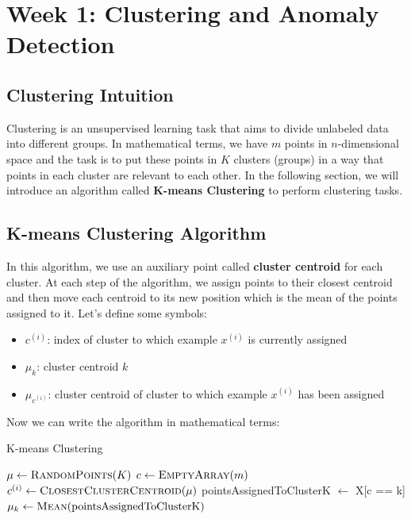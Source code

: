 \documentclass[a4paper, 12pt]{book}
\begin{document}
\section{Week 1: Clustering and Anomaly Detection}

\subsection{Clustering Intuition}

Clustering is an unsupervised learning task that aims to divide unlabeled data into different groups. In mathematical terms, we have $m$ points in $n$-dimensional space and the task is to put these points in $K$ clusters (groups) in a way that points in each cluster are relevant to each other. In the following section, we will introduce an algorithm called \textbf{K-means Clustering} to perform clustering tasks.

\subsection{K-means Clustering Algorithm}

In this algorithm, we use an auxiliary point called \textbf{cluster centroid} for each cluster. At each step of the algorithm, we assign points to their closest centroid and then move each centroid to its new position which is the mean of the points assigned to it. Let's define some symbols:

\begin{itemize}
    \item $c^{(i)}$: index of cluster to which example $x^{(i)}$ is currently assigned
    \item $\mu_k$: cluster centroid $k$
    \item $\mu_{c^{(i)}}$: cluster centroid of cluster to which example $x^{(i)}$ has been assigned
\end{itemize}

\noindent Now we can write the algorithm in mathematical terms:

\begin{algorithm} [h]
\caption{K-means Clustering}
\begin{algorithmic} [1]
\State $\mu \gets \Call{RandomPoints}{K}$
\State $c \gets \Call{EmptyArray}{m}$
\Repeat
        \State $c^{(i)} \gets \Call{ClosestClusterCentroid}{\mu}$
    \EndFor
        \State pointsAssignedToClusterK $\gets$ X[c == k]
        \State $\mu_k \gets \Call{Mean}{\text{pointsAssignedToClusterK}}$
    \EndFor
{}

\end{algorithmic}
\end{algorithm}
\end{document}
